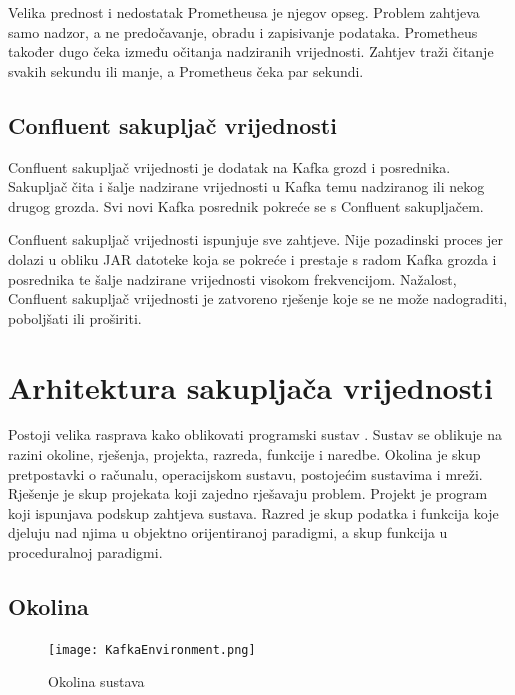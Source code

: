 \documentclass[utf8, diplomski, lmodern, numeric]{fer}
\begin{document}
\newpage
Velika prednost i nedostatak Prometheusa je njegov opseg. Problem zahtjeva samo nadzor, a ne predočavanje, obradu i zapisivanje podataka. Prometheus također dugo čeka između očitanja nadziranih vrijednosti. Zahtjev traži čitanje svakih sekundu ili manje, a Prometheus čeka par sekundi.


\section{Confluent sakupljač vrijednosti}

Confluent sakupljač vrijednosti \citep{confluent-metrics-reporter} je dodatak na Kafka grozd i posrednika. Sakupljač čita i šalje nadzirane vrijednosti u Kafka temu nadziranog ili nekog drugog grozda. Svi novi Kafka posrednik pokreće se s Confluent sakupljačem.

Confluent sakupljač vrijednosti ispunjuje sve zahtjeve. Nije pozadinski proces jer dolazi u obliku JAR datoteke koja se pokreće i prestaje s radom Kafka grozda i posrednika te šalje nadzirane vrijednosti visokom frekvencijom. Nažalost, Confluent sakupljač vrijednosti je zatvoreno rješenje koje se ne može nadograditi, poboljšati ili proširiti.



\chapter{Arhitektura sakupljača vrijednosti}

Postoji velika rasprava kako oblikovati programski sustav \citep{clean-code} \citep{code-complete}. Sustav se oblikuje na razini okoline, rješenja, projekta, razreda, funkcije i naredbe. Okolina je skup pretpostavki o računalu, operacijskom sustavu, postojećim sustavima i mreži. Rješenje je skup projekata koji zajedno rješavaju problem. Projekt je program koji ispunjava podskup zahtjeva sustava. Razred je skup podatka i funkcija koje djeluju nad njima u objektno orijentiranoj paradigmi, a skup funkcija u proceduralnoj paradigmi.


\section{Okolina}

\begin{figure}[H]
    \centering
    \texttt{[image: KafkaEnvironment.png]}
    \caption{Okolina sustava}
    \label{fig:kafka-environment}
\end{figure}
\end{document}
